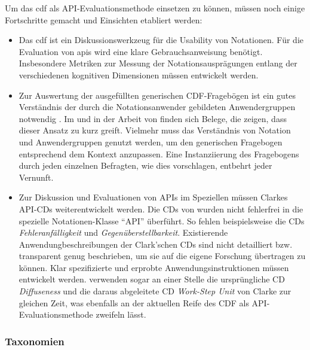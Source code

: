 Um das \gls{cdf} als API-Evaluationsmethode einsetzen zu können, müssen noch einige Fortschritte gemacht und Einsichten etabliert werden:
\begin{itemize}
  \item Das \gls{cdf} ist ein Diskussionswerkzeug für die Usability von Notationen. Für die Evaluation von \acrshort{api}s wird eine klare Gebrauchsanweisung benötigt. Insbesondere Metriken zur Messung der  Notationsausprägungen entlang der verschiedenen kognitiven Dimensionen müssen entwickelt werden.
  
  \item Zur Auswertung der ausgefüllten generischen CDF-Fragebögen ist ein gutes Verständnis der durch die Notationsanwender gebildeten Anwendergruppen notwendig \citep{161956}. Im  und in der Arbeit von \cite{Nykaza:2002im} finden sich Belege, die zeigen, dass dieser Ansatz zu kurz greift. Vielmehr muss das Verständnis von Notation und Anwendergruppen genutzt werden, um den generischen Fragebogen entsprechend dem Kontext anzupassen. Eine Instanziierung des Fragebogens durch jeden einzelnen Befragten, wie dies \cite{161956} vorschlagen, entbehrt jeder Vernunft.
   
  \item Zur Diskussion und Evaluationen von APIs im Speziellen müssen Clarkes API-CDs weiterentwickelt werden. Die CDs von \cite{Green:1989wb} wurden nicht fehlerfrei in die spezielle Notationen-Klasse ``API'' überführt. So fehlen beispielsweise die CDs \textit{Fehleranfälligkeit} und \textit{Gegenüberstellbarkeit}. Existierende  Anwendungbeschreibungen der Clark'schen CDs \citep{Clarke:2003wk,clarke:2006} sind nicht detailliert bzw. transparent genug beschrieben, um sie auf die eigene Forschung übertragen zu können. Klar spezifizierte und erprobte Anwendungsinstruktionen müssen entwickelt werden. \cite{Stylos:2007jb} verwenden sogar an einer Stelle die ursprüngliche CD \textit{Diffuseness} und die daraus abgeleitete CD \textit{Work-Step Unit} von Clarke zur gleichen Zeit, was ebenfalls an der aktuellen Reife des CDF als API-Evaluationsmethode zweifeln lässt. 
\end{itemize}

\subsubsection{Taxonomien}

